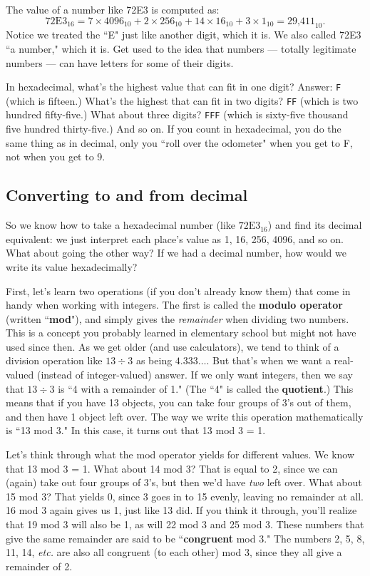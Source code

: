 The value of a number like 72E3 is computed as:
\[
\text{72E3}_{16} = 7 \times \text{4096}_{10} + 2 \times 256_{10} + 14 \times 16_{10} + 3
\times 1_{10} = \text{29,411}_{10}.
\]
Notice we treated the ``E" just like another digit, which it is. We also
called 72E3 ``a number," which it is. Get used to the idea that numbers ---
totally legitimate numbers --- can have letters for some of their digits.

In hexadecimal, what's the highest value that can fit in one digit?
Answer: \texttt{F} (which is fifteen.) What's the highest that can fit in
two digits? \texttt{FF} (which is two hundred fifty-five.) What about three
digits? \texttt{FFF} (which is sixty-five thousand five hundred
thirty-five.) And so on. If you count in hexadecimal, you do the same thing
as in decimal, only you ``roll over the odometer" when you get to F, not
when you get to 9.

\subsection{Converting to and from decimal}

So we know how to take a hexadecimal number (like $\text{72E3}_{16}$) and
find its decimal equivalent: we just interpret each place's value as 1, 16,
256, 4096, and so on. What about going the other way? If we had a decimal
number, how would we write its value hexadecimally?

First, let's learn two operations (if you don't already know them) that
come in handy when working with integers. The first is called the
\textbf{modulo operator} (written ``\textbf{mod}"), and simply gives the
\textit{remainder} when dividing two numbers. This is a concept you
probably learned in elementary school but might not have used since then.
As we get older (and use calculators), we tend to think of a division
operation like $13 \div 3$ as being $4.333\dots$. But that's when we want a
real-valued (instead of integer-valued) answer. If we only want integers,
then we say that $13 \div 3$ is ``4 with a remainder of 1." (The ``4" is
called the \textbf{quotient}.) This means that if you have 13 objects, you
can take four groups of 3's out of them, and then have 1 object left over.
The way we write this operation mathematically is ``13 mod 3." In this
case, it turns out that 13 mod 3 = 1.

Let's think through what the mod operator yields for different values. We
know that 13 mod 3 = 1. What about 14 mod 3? That is equal to 2, since we
can (again) take out four groups of 3's, but then we'd have \textit{two}
left over. What about 15 mod 3? That yields 0, since 3 goes in to 15
evenly, leaving no remainder at all. 16 mod 3 again gives us 1, just like
13 did.  If you think it through, you'll realize that 19 mod 3 will also be
1, as will 22 mod 3 and 25 mod 3. These numbers that give the same
remainder are said to be ``\textbf{congruent} mod 3." The numbers 2, 5, 8,
11, 14, \textit{etc.} are also all congruent (to each other) mod 3, since
they all give a remainder of 2.

